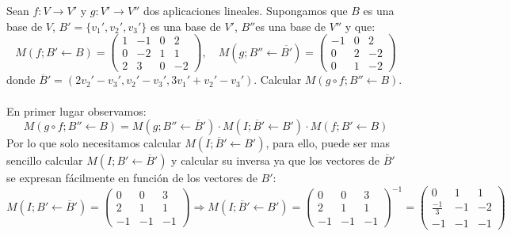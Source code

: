 \begin{ejercicio}
	Sean \( f : V \rightarrow V' \) y \( g : V' \rightarrow V'' \) dos aplicaciones lineales. Supongamos que \( B \) es una base de \( V \), \( B'=\{ v_1',v_2',v_3'\} \) es una base de \( V' \), $B'' $es una base de \( V'' \) y que:
	\begin{equation*}
		M(f;B' \leftarrow B) = \begin{pmatrix} 1 & -1 & 0 & 2 \\ 0 & -2 & 1 & 1 \\ 2 & 3 & 0 & -2 \end{pmatrix}, \quad
		M(g;B'' \leftarrow \overline{B'}) = \begin{pmatrix} -1 & 0 & 2 \\ 0 & 2 & -2 \\ 0 & 1 & -2 \end{pmatrix}
	\end{equation*}
	donde \( \overline{B}' = (2v_2' - v_3', v_2' - v_3', 3v_1' + v_2' - v_3') \). Calcular \( M(g \circ f;B'' \leftarrow B) \).
	\\ \\
	En primer lugar observamos:
	\begin{equation*}
		M(g \circ f;B'' \leftarrow B) = M(g;B'' \leftarrow \overline{B}') \cdot M(I;\overline{B}'\leftarrow B')\cdot M(f;B' \leftarrow B)
	\end{equation*}
	Por lo que solo necesitamos calcular $M(I;\overline{B}'\leftarrow B')$, para ello, puede ser mas sencillo calcular $M(I;B' \leftarrow \overline{B}')$ y calcular su inversa ya
	que los vectores de $\overline{B}'$ se expresan fácilmente en función de los vectores de $B'$:
	\begin{equation*}
		M(I;B' \leftarrow \overline{B}')=\begin{pmatrix}
			0  & 0  & 3  \\
			2  & 1  & 1  \\
			-1 & -1 & -1
		\end{pmatrix} \Rightarrow M(I;\overline{B}'\leftarrow B') = \begin{pmatrix}
			0  & 0  & 3  \\
			2  & 1  & 1  \\
			-1 & -1 & -1
		\end{pmatrix}^{-1} = \begin{pmatrix}
			0            & 1  & 1  \\
			\frac{-1}{3} & -1 & -2 \\
			-1           & -1 & -1
		\end{pmatrix}

\end{equation*}
\end{ejercicio}
